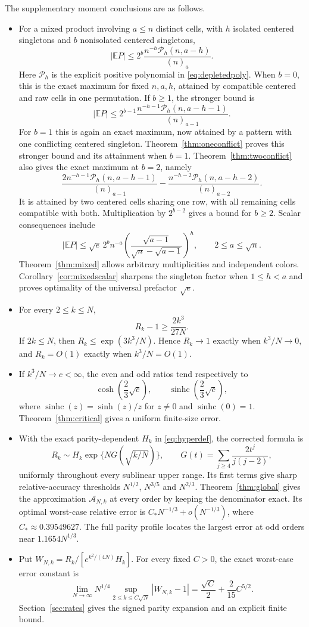 \documentclass[11pt]{article}
\theoremstyle{definition}
\theoremstyle{remark}
\newcommand{\E}{\mathbb E}
\newcommand{\1}{\mathbf 1}
\newcommand{\shc}{\operatorname{sinhc}}
\begin{document}
The supplementary moment conclusions are as follows.
\begin{itemize}
\item For a mixed product involving $a\le n$ distinct cells, with $h$ isolated centered singletons and $b$ nonisolated centered singletons,
\[
|\E P|\le2^b\frac{n^{-h}\mathcal P_h(n,a-h)}{(n)_a}.
\]
Here $\mathcal P_h$ is the explicit positive polynomial in \eqref{eq:depletedpoly}. When $b=0$, this is the exact maximum for fixed $n,a,h$, attained by compatible centered and raw cells in one permutation. If $b\ge1$, the stronger bound is
\[
|\E P|\le2^{b-1}\frac{n^{-h-1}\mathcal P_h(n,a-h-1)}{(n)_{a-1}}.
\]
For $b=1$ this is again an exact maximum, now attained by a pattern with one conflicting centered singleton. Theorem~\ref{thm:oneconflict} proves this stronger bound and its attainment when $b=1$. Theorem~\ref{thm:twoconflict} also gives the exact maximum at $b=2$, namely
\[
\frac{2n^{-h-1}\mathcal P_h(n,a-h-1)}{(n)_{a-1}}
-\frac{n^{-h-2}\mathcal P_h(n,a-h-2)}{(n)_{a-2}}.
\]
It is attained by two centered cells sharing one row, with all remaining cells compatible with both. Multiplication by $2^{b-2}$ gives a bound for $b\ge2$. Scalar consequences include
\[
|\E P|\le\sqrt e\,2^b n^{-a}
\left(\frac{\sqrt{a-1}}{\sqrt n-\sqrt{a-1}}\right)^h,
\qquad 2\le a\le\sqrt n.
\]
Theorem~\ref{thm:mixed} allows arbitrary multiplicities and independent colors. Corollary~\ref{cor:mixedscalar} sharpens the singleton factor when $1\le h<a$ and proves optimality of the universal prefactor $\sqrt e$.
\item For every $2\le k\le N$,
\[
R_k-1\ge\frac{2k^3}{27N}.
\]
If $2k\le N$, then $R_k\le\exp(3k^3/N)$. Hence $R_k\to1$ exactly when $k^3/N\to0$, and $R_k=O(1)$ exactly when $k^3/N=O(1)$.
\item If $k^3/N\to c<\infty$, the even and odd ratios tend respectively to
\[
\cosh\left(\frac23\sqrt c\right),\qquad
\shc\left(\frac23\sqrt c\right),
\]
where $\shc(z)=\sinh(z)/z$ for $z\ne0$ and $\shc(0)=1$. Theorem~\ref{thm:critical} gives a uniform finite-size error.
\item With the exact parity-dependent $H_k$ in \eqref{eq:hyperdef}, the corrected formula is
\[
R_k\sim H_k\exp\{NG(\sqrt{k/N})\},\qquad
G(t)=\sum_{j\ge4}\frac{2t^j}{j(j-2)},
\]
uniformly throughout every sublinear upper range. Its first terms give sharp relative-accuracy thresholds $N^{1/2}$, $N^{3/5}$ and $N^{2/3}$. Theorem~\ref{thm:global} gives the approximation $\mathcal A_{N,k}$ at every order by keeping the denominator exact. Its optimal worst-case relative error is $C_*N^{-1/3}+o(N^{-1/3})$, where $C_*\approx0.39549627$. The full parity profile locates the largest error at odd orders near $1.1654N^{1/3}$.
\item Put $W_{N,k}=R_k/[e^{k^2/(4N)}H_k]$. For every fixed $C>0$, the exact worst-case error constant is
\[
\lim_{N\to\infty}N^{1/4}
\sup_{2\le k\le C\sqrt N}|W_{N,k}-1|
=\frac{\sqrt C}{2}+\frac{2}{15}C^{5/2}.
\]
Section~\ref{sec:rates} gives the signed parity expansion and an explicit finite bound.
\end{itemize}
\end{document}
